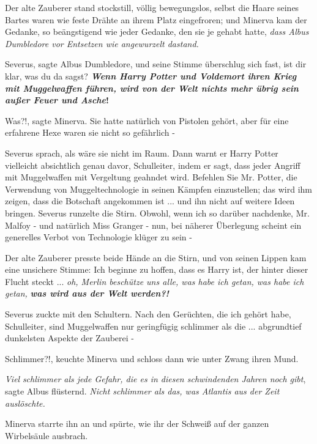 Der alte Zauberer stand stockstill, völlig bewegungslos, selbst die Haare seines
Bartes waren wie feste Drähte an ihrem Platz eingefroren; und Minerva kam der
Gedanke, so beängstigend wie jeder Gedanke, den sie je gehabt hatte, \emph{dass
Albus Dumbledore vor Entsetzen wie angewurzelt dastand.}

\glqq{}Severus\grqq{}, sagte Albus Dumbledore, und seine Stimme überschlug sich
fast, \glqq{}ist dir klar, was du da sagst? \textbf{\emph{Wenn Harry Potter und
Voldemort ihren Krieg mit Muggelwaffen führen, wird von der Welt nichts mehr
übrig sein außer Feuer und Asche}}\textbf{!}\grqq{}

\glqq{}Was?!\grqq{}, sagte Minerva. Sie hatte natürlich von Pistolen gehört, aber
für eine erfahrene Hexe waren sie nicht so gefährlich -

Severus sprach, als wäre sie nicht im Raum. \glqq{}Dann warnt er Harry Potter
vielleicht absichtlich genau davor, Schulleiter, indem er sagt, dass jeder
Angriff mit Muggelwaffen mit Vergeltung geahndet wird. Befehlen Sie Mr. Potter,
die Verwendung von Muggeltechnologie in seinen Kämpfen einzustellen; das wird
ihm zeigen, dass die Botschaft angekommen ist ... und ihn nicht auf weitere
Ideen bringen.\grqq{} Severus runzelte die Stirn. \glqq{}Obwohl, wenn ich so
darüber nachdenke, Mr. Malfoy - und natürlich Miss Granger - nun, bei näherer
Überlegung scheint ein generelles Verbot von Technologie klüger zu sein -\grqq{}

Der alte Zauberer presste beide Hände an die Stirn, und von seinen Lippen kam
eine unsichere Stimme: \glqq{}Ich beginne zu hoffen, dass es Harry ist, der
hinter dieser Flucht steckt ... \emph{oh, Merlin beschütze uns alle, was habe
ich getan, was habe ich getan,} \textbf{\emph{was wird aus der Welt
werden?!}}\grqq{}

Severus zuckte mit den Schultern. \glqq{}Nach den Gerüchten, die ich gehört habe,
Schulleiter, sind Muggelwaffen nur geringfügig schlimmer als die ... abgrundtief
dunkelsten Aspekte der Zauberei -\grqq{}

\glqq{}Schlimmer?!\grqq{}, keuchte Minerva und schloss dann wie unter Zwang ihren
Mund.

\glqq{}\emph{Viel} \emph{schlimmer als jede Gefahr, die es in diesen schwindenden
Jahren noch gibt}\grqq{}, sagte Albus flüsternd. \glqq{}\emph{Nicht schlimmer als
das, was Atlantis aus der Zeit auslöschte.}\grqq{}

Minerva starrte ihn an und spürte, wie ihr der Schweiß auf der ganzen
Wirbelsäule ausbrach.

